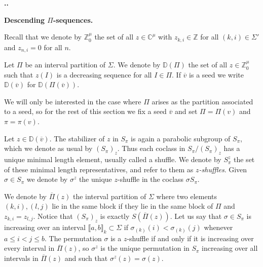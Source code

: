 \documentclass[11pt,fleqn]{amsart}
\renewcommand\thesection{\arabic{section}}
\newcounter{para}[section]
\renewcommand\thepara{\thesection.\arabic{para}}
\def\paragraph{%
 \noindent
 \refstepcounter{para}%
 \textbf{\thepara.}\hspace{1ex}%
}
\newcommand\about[1]{%
 {\bfseries#1.}%
}
\newcommand\CC{\mathbb C}
\newcommand\ZZ{\mathbb Z}
\newcommand\vv{\overline{v}}
\newcommand\PPi{\overline \Pi}
\newcommand\interval[1]{\llbracket #1 \rrbracket}
\newcommand\DD{\mathbb D}
\begin{document}
\paragraph
\label{descending-z}
\about{Descending $\Pi$-sequences}
Recall that we denote by $\ZZ^\mu_0$ the set of all $z \in \CC^\mu$ with
$z_{k,i} \in \ZZ$ for all $(k,i) \in \Sigma'$ and $z_{n,i} = 0$ for all $n$.
\begin{Definition}
Let $\Pi$ be an interval partition of $\Sigma$. We denote by $\DD(\Pi)$ the 
set of all $z \in \ZZ^\mu_0$ such that $z(I)$ is a decreasing sequence for all 
$I \in \Pi$. If $\vv$ is a seed we write $\DD(\vv)$ for $\DD(\Pi(\vv))$.
\end{Definition}
We will only be interested in the case where $\Pi$ arises as the partition 
associated to a seed, so for the rest of this section we fix a seed $\vv$ and
set $\Pi = \Pi(v)$ and $\pi = \pi(v)$.

Let $z \in \DD(\vv)$. The stabilizer of $z$ in $S_\pi$ is again a parabolic 
subgroup of $S_\pi$, which we denote as usual by $(S_\pi)_z$. Thus each 
coclass in $S_\pi/(S_\pi)_z$ has a unique minimal length element, usually 
called a shuffle. We denote by $S_\pi^z$ the set of these minimal length 
representatives, and refer to them as \emph{$z$-shuffles}. Given $\sigma \in
S_\pi$ we denote by $\sigma^z$ the unique $z$-shuffle in the coclass 
$\sigma S_\pi$.

We denote by $\PPi(z)$ the interval partition of $\Sigma$ where two elements 
$(k,i), (l,j)$ lie in the same block if they lie in the same block of $\Pi$ 
and $z_{k,i} = z_{l,j}$. Notice that $(S_\pi)_z$ is exactly $S(\PPi(z))$. Let 
us say that $\sigma \in S_\pi$ is increasing over an interval 
$\interval{a,b}_k \subset \Sigma$ if $\sigma_{(k)}(i) < \sigma_{(k)}(j)$ 
whenever $a \leq i < j \leq b$. The permutation $\sigma$ is a $z$-shuffle if 
and only if it is increasing over every interval in $\PPi(z)$, so $\sigma^z$
is the unique permutation in $S_\pi$ increasing over all intervals in $\PPi(z)$
and such that $\sigma^z(z) = \sigma(z)$.
\end{document}
